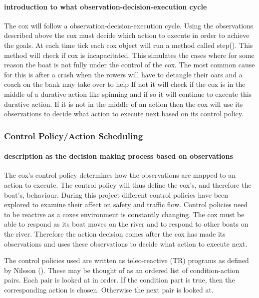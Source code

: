       \paragraph{introduction to what observation-decision-execution cycle}
      The cox will follow a observation-decision-execution cycle. Using the observations described above the cox must decide which action to execute in order to achieve the goals. At each time tick each cox object will run a method called step(). This method will check if cox is incapacitated. This simulates the cases where for some reason the boat is not fully under the control of the cox. The most common cause for this is after a crash when the rowers will have to detangle their oars and a coach on the bank may take over to help If not it will check if the cox is in the middle of a durative action like spinning and if so it will continue to execute this durative action. If it is not in the middle of an action then the cox will use its observations to decide what action to execute next based on its control policy.
      
      \subsubsection{Control Policy/Action Scheduling}
      \paragraph{description as the decision making process based on observations}
      The cox's control policy determines how the observations are mapped to an action to execute. The control policy will thus define the cox's, and therefore the boat's, behaviour. During this project different control policies have been explored to examine their affect on safety and traffic flow. Control policies need to be reactive as a coxes environment is constantly changing. The cox must be able to respond as its boat moves on the river and to respond to other boats on the river. Therefore the action decision comes after the cox has made its observations and uses these observations to decide what action to execute next.
      
      The control policies used are written as teleo-reactive (TR) programs as defined by Nilsson (\cite{Nilsson1994}). These may be thought of as an ordered list of condition-action pairs. Each pair is looked at in order. If the condition part is true, then the corresponding action is chosen. Otherwise the next pair is looked at.
      
